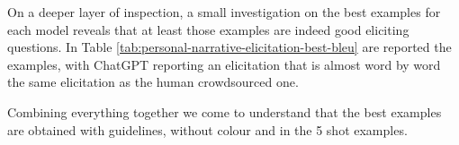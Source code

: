 
On a deeper layer of inspection, a small investigation on the best examples for each model reveals that at least those examples are indeed good eliciting questions. In Table \ref{tab:personal-narrative-elicitation-best-bleu} are reported the examples, with ChatGPT reporting an elicitation that is almost word by word the same elicitation as the human crowdsourced one.

Combining everything together we come to understand that the best examples are obtained with guidelines, without colour and in the 5 shot examples. %